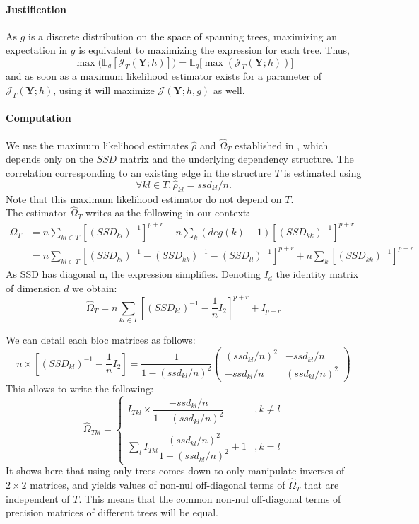 \documentclass[11pt,a4paper]{article}
\newcommand{\Ybf}{\boldsymbol{Y}}
\newcommand{\Esp}{\mathds{E}}
\begin{document}
 
\paragraph{Justification\\}

As $g$ is a discrete distribution on the space of spanning trees, maximizing an expectation in $g$ is equivalent to maximizing the expression for each tree. Thus,
$$ \max\big(\Esp_g[\mathcal{J}_T(\Ybf;h)]\big) = \Esp_g\big[\max(\mathcal{J}_T(\Ybf;h))\big]$$
and as soon as a maximum likelihood estimator exists for a parameter of $\mathcal{J}_T(\Ybf;h)$, using it will maximize $\mathcal{J}(\Ybf;h,g)$ as well. 

\paragraph{Computation\\}
 We use the maximum likelihood estimates $\hat{\rho}$ and $\hat{\Omega}_T$ established in \citet{Lau96}, which depends only on the $SSD$ matrix and the underlying dependency structure.
  The correlation corresponding to an existing edge in the structure $T$ is estimated using
  $$ \forall kl\in T,\boxed{\hat{\rho}_{kl} = ssd_{kl}/n}.$$
  Note that this maximum likelihood estimator do not depend on $T$.\\
  
   The estimator  $\hat{\Omega}_T$  writes as the following in our context:
\begin{align*}
\widehat{\Omega}_T &= n  \sum_{kl\in T}   [(SSD_{kl})^{-1}]^{p+r} - n\sum_k (deg(k)-1)[(SSD_{kk})^{-1}]^{p+r}\\
&=n \sum_{kl\in T}  [(SSD_{kl})^{-1} - (SSD_{kk})^{-1} -  (SSD_{ll})^{-1} ]^{p+r} + n\sum_k[(SSD_{kk})^{-1}]^{p+r}
\end{align*}
As SSD has diagonal n, the expression simplifies. Denoting $I_d$ the identity matrix of dimension $d$ we obtain:
$$\widehat{\Omega}_T =n\sum_{kl\in T} [(SSD_{kl})^{-1} -\frac{1}{n} I_2]^{p+r}+ I_{p+r}$$

We can detail each bloc matrices as follows:
\[
n\times [(SSD_{kl})^{-1} - \frac{1}{n}I_2] = \frac{1}{1-(ssd_{kl}/n)^2}
\left(\begin{array}{cc}
		(ssd_{kl}/n)^2   & -ssd_{kl}/n\\
		-ssd_{kl}/n& (ssd_{kl}/n)^2 
		\end{array}\right)
\]
This allows to write the following:
 \[ \boxed{\widehat{\Omega}_{Tkl}=\left\{\begin{array}{cl}I_{Tkl}
  \times\dfrac{ -ssd_{kl}/n}{1-(ssd_{kl}/n)^2} & ,k\neq l\\\\
 \sum_l I_{Tkl} \dfrac{(ssd_{kl}/n)^2}{1-(ssd_{kl}/n)^2} +1 & ,k=l
 \end{array}\right.
 }\]
It shows here that using only trees comes down to only manipulate inverses of $2\times 2$ matrices, and yields values of non-nul off-diagonal terms of $\hat{\Omega}_T$ that are independent of $T$. This means that the common non-nul off-diagonal terms of precision matrices of different trees will be equal. \\
\end{document}

